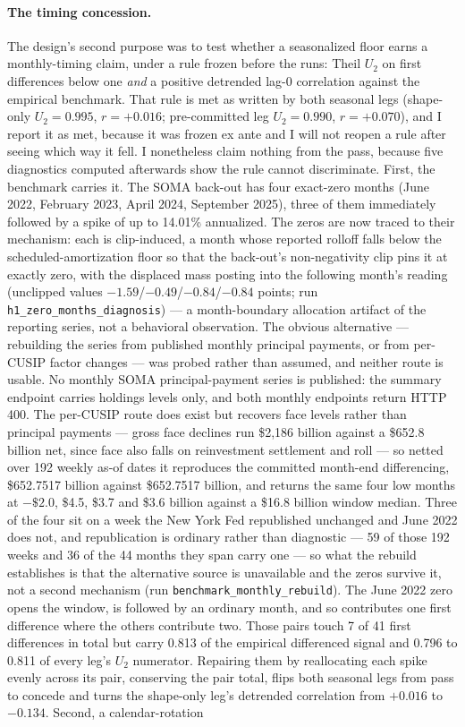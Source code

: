 \documentclass[12pt]{article}
\begin{document}
\paragraph{The timing concession.} The design's second purpose was to test whether a seasonalized floor earns a monthly-timing claim, under a rule frozen before the runs: Theil $U_2$ on first differences below one \emph{and} a positive detrended lag-0 correlation against the empirical benchmark. That rule is met as written by both seasonal legs (shape-only $U_2 = 0.995$, $r = +0.016$; pre-committed leg $U_2 = 0.990$, $r = +0.070$), and I report it as met, because it was frozen ex ante and I will not reopen a rule after seeing which way it fell. I nonetheless claim nothing from the pass, because five diagnostics computed afterwards show the rule cannot discriminate. First, the benchmark carries it. The SOMA back-out has four exact-zero months (June 2022, February 2023, April 2024, September 2025), three of them immediately followed by a spike of up to 14.01\% annualized. The zeros are now traced to their mechanism: each is clip-induced, a month whose reported rolloff falls below the scheduled-amortization floor so that the back-out's non-negativity clip pins it at exactly zero, with the displaced mass posting into the following month's reading (unclipped values $-1.59$/$-0.49$/$-0.84$/$-0.84$ points; run \texttt{h1\_zero\_months\_diagnosis}) --- a month-boundary allocation artifact of the reporting series, not a behavioral observation. The obvious alternative --- rebuilding the series from published monthly principal payments, or from per-CUSIP factor changes --- was probed rather than assumed, and neither route is usable. No monthly SOMA principal-payment series is published: the summary endpoint carries holdings levels only, and both monthly endpoints return HTTP 400. The per-CUSIP route does exist but recovers face levels rather than principal payments --- gross face declines run \$2{,}186 billion against a \$652.8 billion net, since face also falls on reinvestment settlement and roll --- so netted over 192 weekly as-of dates it reproduces the committed month-end differencing, \$652.7517 billion against \$652.7517 billion, and returns the same four low months at $-\$2.0$, \$4.5, \$3.7 and \$3.6 billion against a \$16.8 billion window median. Three of the four sit on a week the New York Fed republished unchanged and June 2022 does not, and republication is ordinary rather than diagnostic --- 59 of those 192 weeks and 36 of the 44 months they span carry one --- so what the rebuild establishes is that the alternative source is unavailable and the zeros survive it, not a second mechanism (run \texttt{benchmark\_monthly\_rebuild}). The June 2022 zero opens the window, is followed by an ordinary month, and so contributes one first difference where the others contribute two. Those pairs touch 7 of 41 first differences in total but carry 0.813 of the empirical differenced signal and 0.796 to 0.811 of every leg's $U_2$ numerator. Repairing them by reallocating each spike evenly across its pair, conserving the pair total, flips both seasonal legs from pass to concede and turns the shape-only leg's detrended correlation from $+0.016$ to $-0.134$. Second, a calendar-rotation 
\end{document}
